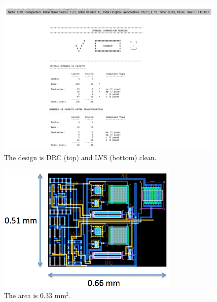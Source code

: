 \documentclass[10pt]{amsart}
\begin{document}
\begin{figure}[H]
	\begin{center}
		\includegraphics[width=6in]{Media/checks.png}
	\end{center}
	\caption{The design is DRC (top) and LVS (bottom) clean.}
	\label{fig:cc}
\end{figure}

\begin{figure}[H]
	\begin{center}
		\includegraphics[width=3.5in]{Media/area.png}
	\end{center}
	\caption{The area is 0.33 mm$^2$.}
	\label{fig:cc}
\end{figure}
\end{document}
